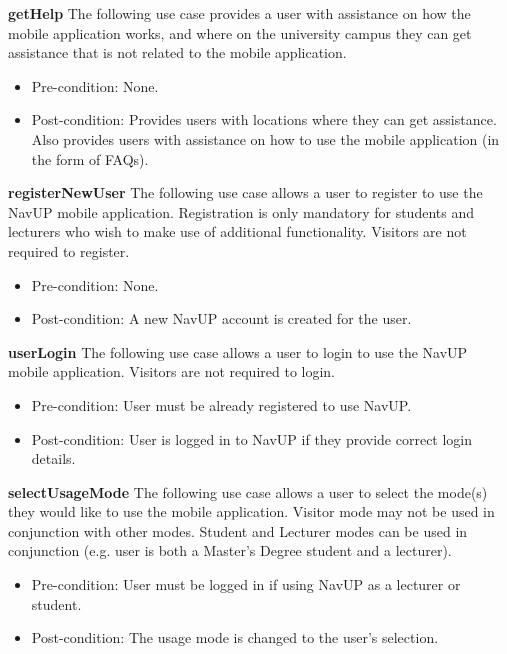 \documentclass[12pt,a4paper]{article}
\begin{document}
	    \medskip

	    \textbf{getHelp}
		The following use case provides a user with assistance on how the mobile application works, and where on the 				    university campus they can get assistance that is not related to the mobile application.

		\begin{itemize}
		  \item Pre-condition: None.
		   \item Post-condition: Provides users with locations where they can get assistance. Also provides users with 		  		             assistance on how to use the mobile application (in the form of FAQs).
		\end{itemize}

		\textbf{registerNewUser}
		The following use case allows a user to register to use the NavUP mobile application. Registration is only mandatory 			for students and lecturers who wish to make use of additional functionality. Visitors are not required to register.

		\begin{itemize}
		  \item Pre-condition: None.
		   \item Post-condition: A new NavUP account is created for the user.
		\end{itemize}

		\textbf{userLogin}
			The following use case allows a user to login to use the NavUP mobile application. Visitors are not required to 				login.

		\begin{itemize}
		  \item Pre-condition: User must be already registered to use NavUP.
		   \item Post-condition: User is logged in to NavUP if they provide correct login details.
		\end{itemize}

	    \textbf{selectUsageMode}
	    The following use case allows a user to select the mode(s) they would like to use the mobile application. Visitor mode    		may not be used in conjunction with other modes. Student and Lecturer modes can be used in conjunction (e.g. user is 			both a Master's Degree student and a lecturer).

		\begin{itemize}
		  \item Pre-condition: User must be logged in if using NavUP as a lecturer or student.
		   \item Post-condition: The usage mode is changed to the user's selection.
		\end{itemize}
\end{document}
